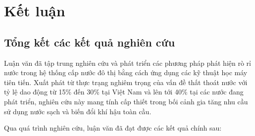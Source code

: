\chapter{Kết luận}

\section{Tổng kết các kết quả nghiên cứu}

Luận văn đã tập trung nghiên cứu và phát triển các phương pháp phát hiện rò rỉ nước trong hệ thống cấp nước đô thị bằng cách ứng dụng các kỹ thuật học máy tiên tiến. Xuất phát từ thực trạng nghiêm trọng của vấn đề thất thoát nước với tỷ lệ dao động từ 15\% đến 30\% tại Việt Nam và lên tới 40\% tại các nước đang phát triển, nghiên cứu này mang tính cấp thiết trong bối cảnh gia tăng nhu cầu sử dụng nước sạch và biến đổi khí hậu toàn cầu.

Qua quá trình nghiên cứu, luận văn đã đạt được các kết quả chính sau:

